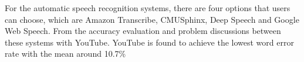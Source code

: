 \documentclass[natbib]{muthesis}
\begin{document}
 For the automatic speech recognition systems, there are four options that users can choose, which are Amazon Transcribe, CMUSphinx, Deep Speech and Google Web Speech. From the accuracy evaluation and problem discussions between these systems with YouTube. YouTube is found to achieve the lowest word error rate with the mean around 10.7\%
 
 
  
  \biography
  
\end{document}
